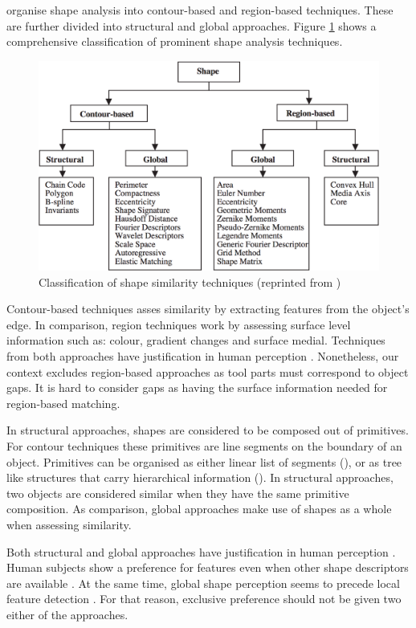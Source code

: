 \documentclass[
    floatsintext
]{article}
\begin{document}
\cite{zhang2004} organise shape analysis into contour-based and region-based techniques.
These are further divided into structural and global approaches.
Figure \ref{fig:shape_similarity} shows a comprehensive classification of prominent shape analysis techniques. 

\begin{figure}[h]
  \centering
  \includegraphics[width=1\textwidth]{./figures/similarity_techniques.png}
  \caption{Classification of shape similarity techniques (reprinted from \cite{zhang2004})}
  \label{fig:shape_similarity}
\end{figure}  

Contour-based techniques asses similarity by extracting features from the object's edge.
In comparison, region techniques work by assessing surface level information such as: colour, gradient changes and surface medial.
Techniques from both approaches have justification in human perception \cite{chatbri2016}.
Nonetheless, our context excludes region-based approaches as tool parts must correspond to object gaps.
It is hard to consider gaps as having the surface information needed for region-based matching.

In structural approaches, shapes are considered to be composed out of primitives. For contour techniques these primitives are line segments on the boundary of an object.
Primitives can be organised as either linear list of segments (\cite{zhang2004}), or as tree like structures that carry hierarchical information (\cite{zhu2015}).
In structural approaches, two objects are considered similar when they have the same primitive composition.
As comparison, global approaches make use of shapes as a whole when assessing similarity. 

Both structural and global approaches have justification in human perception \cite{zhang2004}.
Human subjects show a preference for features even when other shape descriptors are available \cite{chatbri2016}.
At the same time, global shape perception seems to precede local feature detection \cite{navon1977}. 
For that reason, exclusive preference should not be given two either of the approaches.
\end{document}
